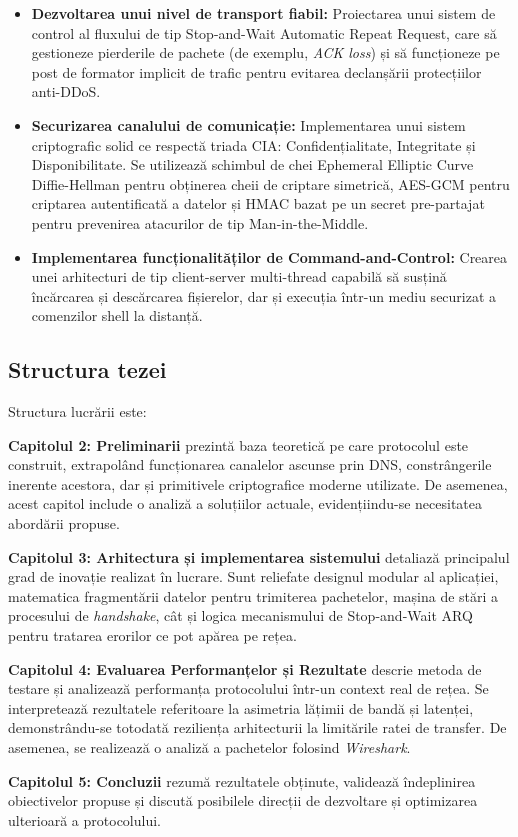 \begin{itemize}
    \item \textbf{Dezvoltarea unui nivel de transport fiabil:} Proiectarea unui sistem de control al fluxului de tip Stop-and-Wait Automatic Repeat Request, care să gestioneze pierderile de pachete (de exemplu, \textit{ACK loss}) și să funcționeze pe post de formator implicit de trafic pentru evitarea declanșării protecțiilor anti-DDoS.
    \item \textbf{Securizarea canalului de comunicație:} Implementarea unui sistem criptografic solid ce respectă triada CIA: Confidențialitate, Integritate și Disponibilitate. Se utilizează schimbul de chei Ephemeral Elliptic Curve Diffie-Hellman pentru obținerea cheii de criptare simetrică, AES-GCM pentru criptarea autentificată a datelor și HMAC bazat pe un secret pre-partajat pentru prevenirea atacurilor de tip Man-in-the-Middle.
    \item \textbf{Implementarea funcționalităților de Command-and-Control:} Crearea unei arhitecturi de tip client-server multi-thread capabilă să susțină încărcarea și descărcarea fișierelor, dar și execuția într-un mediu securizat a comenzilor shell la distanță. 
\end{itemize}

\subsection{Structura tezei}
Structura lucrării este:

\textbf{Capitolul 2: Preliminarii} prezintă baza teoretică pe care protocolul este construit, extrapolând funcționarea canalelor ascunse prin DNS, constrângerile inerente acestora, dar și primitivele criptografice moderne utilizate. De asemenea, acest capitol include o analiză a soluțiilor actuale, evidențiindu-se necesitatea abordării propuse. 

\textbf{Capitolul 3: Arhitectura și implementarea sistemului} detaliază principalul grad de inovație realizat în lucrare. Sunt reliefate designul modular al aplicației, matematica fragmentării datelor pentru trimiterea pachetelor, mașina de stări a procesului de \textit{handshake}, cât și logica mecanismului de Stop-and-Wait ARQ pentru tratarea erorilor ce pot apărea pe rețea.  

\textbf{Capitolul 4: Evaluarea Performanțelor și Rezultate} descrie metoda de testare și analizează performanța protocolului într-un context real de rețea. Se interpretează rezultatele referitoare la asimetria lățimii de bandă și latenței, demonstrându-se totodată reziliența arhitecturii la limitările ratei de transfer. De asemenea, se realizează o analiză a pachetelor folosind \textit{Wireshark}.

\textbf{Capitolul 5: Concluzii} rezumă rezultatele obținute, validează îndeplinirea obiectivelor propuse și discută posibilele direcții de dezvoltare și optimizarea ulterioară a protocolului.